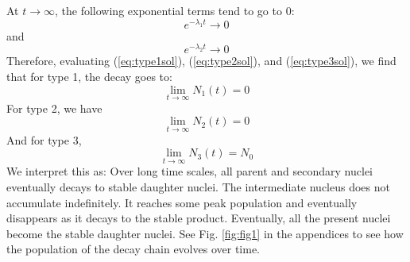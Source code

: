 \documentclass[12pt,a4paper]{article}
\begin{document}
\begin{solution_pset}
\begin{enumerate}[\textbf{(\alph*)}]
				  At $t\to\infty$, the following exponential terms tend to go to 0:
				  \[
					  e^{-\lambda_1 t} \to 0
				  \]
				  and
				  \[
					  e^{-\lambda_2 t} \to 0 
				  \]
				  Therefore, evaluating (\ref{eq:type1sol}), (\ref{eq:type2sol}), and (\ref{eq:type3sol}), we find that
				  for type 1, the decay goes to:
				  \[
					  \boxed{
						  \lim_{t\to\infty} N_1(t) = 0
					  }
				  \]
				  For type 2, we have
				  \[
					  \boxed{
						  \lim_{t\to\infty} N_2(t) = 0
					  }
				  \]
				  And for type 3, 
				  \[
					  \boxed{
						  \lim_{t\to\infty} N_3(t) = N_0
					  }
				  \]
				  We interpret this as: Over long time scales, all parent and secondary nuclei eventually 
				  decays to stable daughter nuclei. The intermediate nucleus does not accumulate indefinitely.
				  It reaches some peak population and eventually disappears as it decays to the stable product.
				  Eventually, all the present nuclei become the stable daughter nuclei. See Fig. \ref{fig:fig1} in the 
				  appendices to see how the population of the decay chain evolves over time.
		\end{enumerate}
			
	\end{solution_pset}
	\newpage

\end{document}
